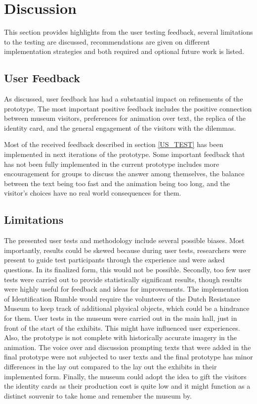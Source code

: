 \section{Discussion}

This section provides highlights from the user testing feedback, several limitations to the testing are discussed, recommendations are given on different implementation strategies and both required and optional future work is listed. 

\subsection{User Feedback}
As discussed, user feedback has had a substantial impact on refinements of the prototype. The most important positive feedback includes the positive connection between museum visitors, preferences for animation over text, the replica of the identity card, and the general engagement of the visitors with the dilemmas. 

Most of the received feedback described in section \ref{US_TEST} has been implemented in next iterations of the prototype. Some important feedback that has not been fully implemented in the current prototype includes more encouragement for groups to discuss the answer among themselves, the balance between the text being too fast and the animation being too long, and the visitor's choices have no real world consequences for them. 

\subsection{Limitations}
The presented user tests and methodology include several possible biases. Most importantly, results could be skewed because during user tests, researchers were present to guide test participants through the experience and were asked questions. In its finalized form, this would not be possible. 
Secondly, too few user tests were carried out to provide statistically significant results, though results were highly useful for feedback and ideas for improvements. The implementation of Identification Rumble would require the volunteers of the Dutch Resistance Museum to keep track of additional physical objects, which could be a hindrance for them. User tests in the museum were carried out in the main hall, just in front of the start of the exhibits. This might have influenced user experiences. Also, the prototype is not complete with historically accurate imagery in the animation. The voice over and discussion prompting texts that were added in the final prototype were not subjected to user texts and the final prototype has minor differences in the lay out compared to the lay out the exhibits in their implemented form. 
Finally, the museum could adopt the idea to gift the visitors the identity cards as their production cost is quite low and it might function as a distinct souvenir to take home and remember the museum by. 

